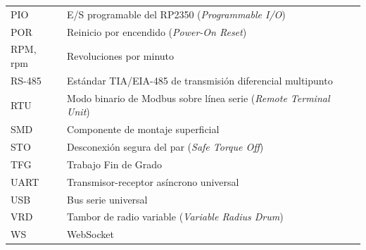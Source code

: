 \begin{longtable}{@{}L{0.18\textwidth}L{0.76\textwidth}@{}}
PIO      & E/S programable del RP2350 (\emph{Programmable I/O}) \\
POR      & Reinicio por encendido (\emph{Power-On Reset}) \\
RPM, rpm & Revoluciones por minuto \\
RS-485   & Estándar TIA/EIA-485 de transmisión diferencial multipunto \\
RTU      & Modo binario de Modbus sobre línea serie (\emph{Remote Terminal Unit}) \\
SMD      & Componente de montaje superficial \\
STO      & Desconexión segura del par (\emph{Safe Torque Off}) \\
TFG      & Trabajo Fin de Grado \\
UART     & Transmisor-receptor asíncrono universal \\
USB      & Bus serie universal \\
VRD      & Tambor de radio variable (\emph{Variable Radius Drum}) \\
WS       & WebSocket \\
\bottomrule
\end{longtable}

